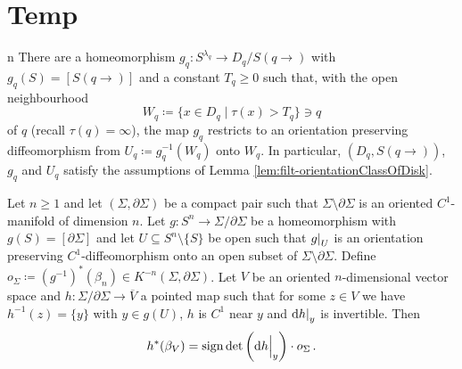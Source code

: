 \pagestyle{empty}
\section{Temp}



 n There are a homeomorphism $g_q:S^{\lambda_q}\to D_q/S(q\to)$ with $g_q(S)=[S(q\to)]$ and a constant $T_q\geq0$ such that, with the open neighbourhood
\begin{equation*}
	W_q\coloneq\{x\in D_q\mid\tau(x)>T_q\}\ni q
\end{equation*}
of $q$ (recall $\tau(q)=\infty$), the map $g_q$ restricts to an orientation preserving diffeomorphism from $U_q\coloneq g_q^{-1}(W_q)$ onto $W_q$. In particular, $(D_q,S(q\to))$, $g_q$ and $U_q$ satisfy the assumptions of Lemma \ref{lem:filt-orientationClassOfDisk}.


 \begin{lemma}\label{lem:filt-orientationClassOfDisk}
	Let $n\geq 1$ and let $(\Sigma,\partial\Sigma)$ be a compact pair such that $\Sigma\setminus\partial\Sigma$ is an oriented $C^1$-manifold of dimension $n$. Let $g:S^n\to\Sigma/\partial\Sigma$ be a homeomorphism with $g(S)=[\partial\Sigma]$ and let $U\subseteq S^n\setminus\{S\}$ be open such that $\restr{g}{U}$ is an orientation preserving $C^1$-diffeomorphism onto an open subset of $\Sigma\setminus\partial\Sigma$. Define $o_\Sigma\coloneq(g^{-1})^*(\beta_n)\in K^{-n}(\Sigma,\partial\Sigma)$. Let $V$ be an oriented $n$-dimensional vector space and $h:\Sigma/\partial\Sigma\to\overline V$ a pointed map such that for some $z\in V$ we have $h^{-1}(z)=\{y\}$ with $y\in g(U)$, $h$ is $C^1$ near $y$ and $\restr{\diff h}{y}$ is invertible. Then
	\begin{equation*}
		h^*(\beta_V)=\sign\det\left(\restr{\diff h}{y}\right)\cdot o_\Sigma\,.
	\end{equation*}
\end{lemma}